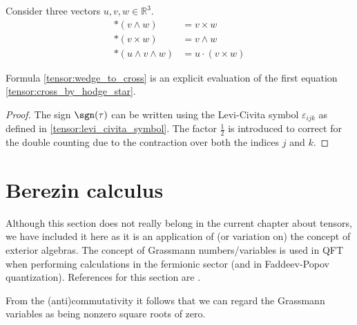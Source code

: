     \begin{result}\label{tensor:hodge_star_vectorcalculus}
        Consider three vectors $u, v, w\in\mathbb{R}^3$.
        \begin{align}
            \ast(v\wedge w) &= v\times w \label{tensor:cross_by_hodge_star}\\
            \ast(v\times w) &= v\wedge w\\
            \ast(u\wedge v\wedge w) &= u\cdot(v\times w)
        \end{align}
    \end{result}
    \begin{remark}
        Formula \ref{tensor:wedge_to_cross} is an explicit evaluation of the first equation \ref{tensor:cross_by_hodge_star}.
        \begin{proof}
            The sign $\sgn(\tau)$ can be written using the Levi-Civita symbol $\varepsilon_{ijk}$ as defined in \ref{tensor:levi_civita_symbol}. The factor $\frac{1}{2}$ is introduced to correct for the double counting due to the contraction over both the indices $j$ and $k$.
        \end{proof}
    \end{remark}


\section{Berezin calculus}

    Although this section does not really belong in the current chapter about tensors, we have included it here as it is an application of (or variation on) the concept of exterior algebras. The concept of Grassmann numbers/variables is used in QFT when performing calculations in the fermionic sector (and in Faddeev-Popov quantization). References for this section are \cite{losev_berezin, AMP2}.

    \begin{remark}
        From the (anti)commutativity it follows that we can regard the Grassmann variables as being nonzero square roots of zero.
    \end{remark}

